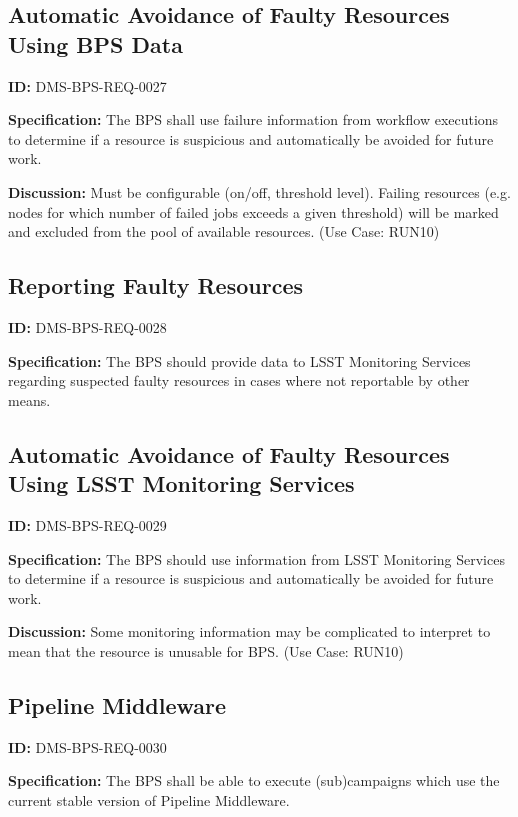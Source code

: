 \documentclass[SE,toc,lsstdraft]{lsstdoc}
\begin{document}
\subsection{Automatic Avoidance of Faulty Resources Using BPS Data}

\label{DMS-BPS-REQ-0027}
\textbf{ID:} DMS-BPS-REQ-0027

\textbf{Specification:}
The BPS shall use failure information from workflow executions to determine if a resource is suspicious and automatically be avoided for future work.

\textbf{Discussion:}
Must be configurable (on/off, threshold level).  Failing resources (e.g. nodes for which number of failed jobs exceeds a given threshold) will be marked and excluded from the pool of available resources.  (Use Case: RUN10)

\subsection{Reporting Faulty Resources}

\label{DMS-BPS-REQ-0028}
\textbf{ID:} DMS-BPS-REQ-0028

\textbf{Specification:}
The BPS should provide data to LSST Monitoring Services regarding suspected faulty resources in cases where not reportable by other means.

\subsection{Automatic Avoidance of Faulty Resources Using LSST Monitoring Services}

\label{DMS-BPS-REQ-0029}
\textbf{ID:} DMS-BPS-REQ-0029

\textbf{Specification:}
The BPS should use information from LSST Monitoring Services to determine if a resource is suspicious and automatically be avoided for future work.

\textbf{Discussion:}
Some monitoring information may be complicated to interpret to mean that the resource is unusable for BPS.  (Use Case: RUN10)

\subsection{Pipeline Middleware}

\label{DMS-BPS-REQ-0030}
\textbf{ID:} DMS-BPS-REQ-0030

\textbf{Specification:}
The BPS shall be able to execute (sub)campaigns which use the current stable version of Pipeline Middleware.
\end{document}
